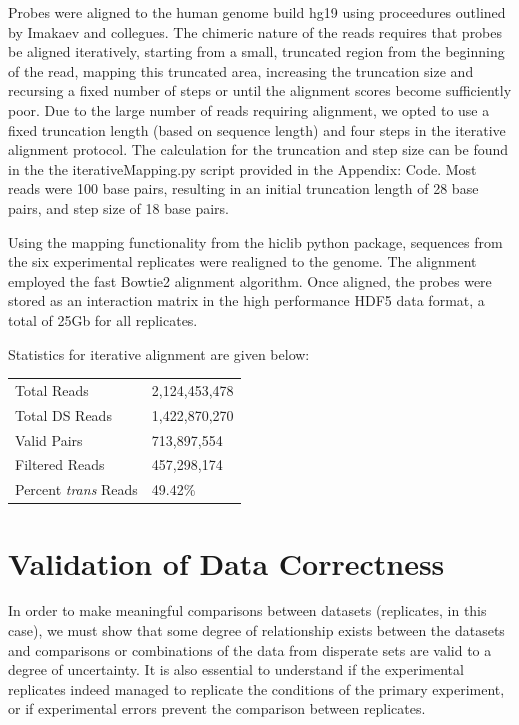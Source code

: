 \documentclass[phd,tocprelim]{cornell}
\begin{document}
Probes were aligned to the human genome build hg19 using proceedures outlined by
Imakaev and collegues\cite{imakaev2012}.  The chimeric nature of the reads
requires that probes be aligned iteratively, starting from a small, truncated
region from the beginning of the read, mapping this truncated area, increasing
the truncation size and recursing a fixed number of steps or until the alignment
scores become sufficiently poor.  Due to the large number of reads requiring
alignment, we opted to use a fixed truncation length (based on sequence length)
and four steps in the iterative alignment protocol.  The calculation
for the truncation and step size can be found in the the iterativeMapping.py
script provided in the Appendix: Code.  Most reads were 100 base pairs, resulting
in an initial truncation length of 28 base pairs, and step size of 18 base pairs.

Using the mapping functionality from the hiclib python package\cite{imakaev2012},
sequences from the six experimental replicates were realigned to the genome.  The
alignment employed the fast Bowtie2 alignment algorithm\cite{langmead2012}.  Once
aligned, the probes were stored as an interaction matrix in the high performance
HDF5\cite{hdf5} data format, a total of 25Gb for all replicates.

Statistics for iterative alignment are given below:

\begin{center}
  \begin{table}
    \begin{tabular}{l l}
    Total Reads & 2,124,453,478 \\
    Total DS Reads & 1,422,870,270 \\
    Valid Pairs & 713,897,554 \\
    Filtered Reads & 457,298,174 \\
    Percent \textit{trans} Reads & 49.42\% \\
    \end{tabular}
  \end{table}
\end{center}


\chapter{Validation of Data Correctness}

In order to make meaningful comparisons between datasets (replicates,
in this case), we must show that some degree of relationship exists between
the datasets and comparisons or combinations of the data from disperate sets
are valid to a degree of uncertainty.  It is also essential to understand if the
experimental replicates indeed managed to replicate the conditions of the primary
experiment, or if experimental errors prevent the comparison between replicates.
\end{document}
